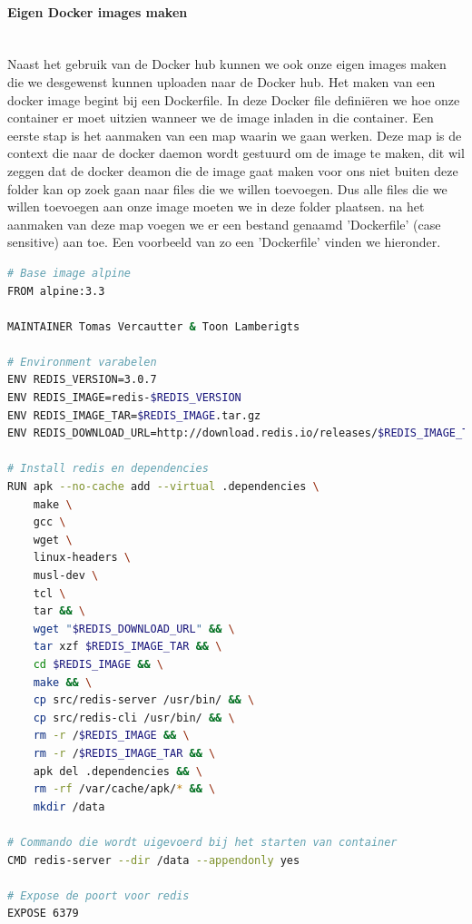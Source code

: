 \paragraph{Eigen Docker images maken}~\\

Naast het gebruik van de Docker hub kunnen we ook onze eigen images maken die we desgewenst kunnen uploaden naar de Docker hub. Het maken van een docker image begint bij een Dockerfile. In deze Docker file definiëren we hoe onze container er moet uitzien wanneer we de image inladen in die container. Een eerste stap is het aanmaken van een map waarin we gaan werken. Deze map is de context die naar de docker daemon wordt gestuurd om de image te maken, dit wil zeggen dat de docker deamon die de image gaat maken voor ons niet buiten deze folder kan op zoek gaan naar files die we willen toevoegen. Dus alle files die we willen toevoegen aan onze image moeten we in deze folder plaatsen. na het aanmaken van deze map voegen we er een bestand genaamd 'Dockerfile' (case sensitive) aan toe. Een voorbeeld van zo een 'Dockerfile' vinden we hieronder. 

\begin{lstlisting}[language=bash, style=configstyle]
# Base image alpine
FROM alpine:3.3

MAINTAINER Tomas Vercautter & Toon Lamberigts

# Environment varabelen
ENV REDIS_VERSION=3.0.7
ENV REDIS_IMAGE=redis-$REDIS_VERSION
ENV REDIS_IMAGE_TAR=$REDIS_IMAGE.tar.gz
ENV REDIS_DOWNLOAD_URL=http://download.redis.io/releases/$REDIS_IMAGE_TAR

# Install redis en dependencies
RUN apk --no-cache add --virtual .dependencies \
    make \
    gcc \
    wget \
    linux-headers \
    musl-dev \
    tcl \
    tar && \
    wget "$REDIS_DOWNLOAD_URL" && \
    tar xzf $REDIS_IMAGE_TAR && \
    cd $REDIS_IMAGE && \
    make && \
    cp src/redis-server /usr/bin/ && \
    cp src/redis-cli /usr/bin/ && \
    rm -r /$REDIS_IMAGE && \
    rm -r /$REDIS_IMAGE_TAR && \
    apk del .dependencies && \
    rm -rf /var/cache/apk/* && \
    mkdir /data

# Commando die wordt uigevoerd bij het starten van container
CMD redis-server --dir /data --appendonly yes

# Expose de poort voor redis
EXPOSE 6379
\end{lstlisting}


